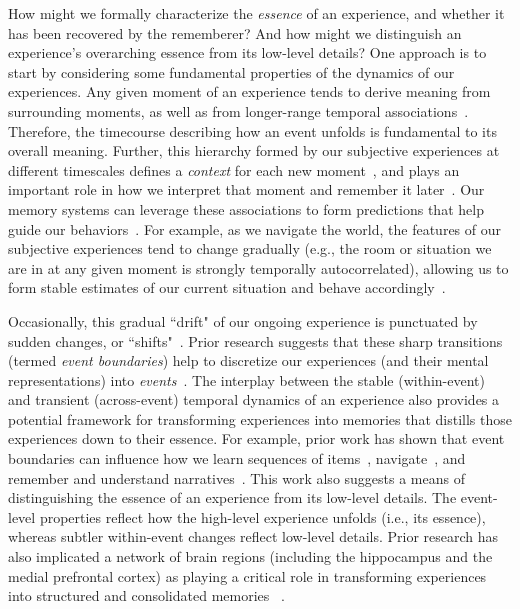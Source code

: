 \documentclass{article}
\begin{document}
How might we formally characterize the \textit{essence} of an experience, and whether it has been recovered by the rememberer?  And how might we distinguish an experience's overarching essence from its low-level details?  One approach is to start by considering some fundamental properties of the dynamics of our experiences.  Any given moment of an experience tends to derive meaning from surrounding moments, as well as from longer-range temporal associations~\citep{LernEtal11, Mann19, Mann20}.  Therefore, the timecourse describing how an event unfolds is fundamental to its overall meaning.  Further, this hierarchy formed by our subjective experiences at different timescales defines a \textit{context} for each new moment~\citep[e.g., ][]{HowaKaha02a, HowaEtal14}, and plays an important role in how we interpret that moment and remember it later~\citep[for review see][]{MannEtal15, Mann20}.  Our memory systems can leverage these associations to form predictions that help guide our behaviors~\citep{RangRitc12}.  For example, as we navigate the world, the features of our subjective experiences tend to change gradually (e.g., the room or situation we are in at any given moment is strongly temporally autocorrelated), allowing us to form stable estimates of our current situation and behave accordingly~\citep{ZackEtal07, ZwaaRadv98}.

Occasionally, this gradual ``drift" of our ongoing experience is punctuated by sudden changes, or ``shifts"~\citep[e.g., when we walk through a doorway; ][]{RadvZack17}.  Prior research suggests that these sharp transitions (termed \textit{event boundaries}) help to discretize our experiences (and their mental representations) into \textit{events}~\citep{RadvZack17, BrunEtal18, HeusEtal18b, ClewDava17, EzzyDava11, DuBrDava13}.  The interplay between the stable (within-event) and transient (across-event) temporal dynamics of an experience also provides a potential framework for transforming experiences into memories that distills those experiences down to their essence.  For example, prior work has shown that event boundaries can influence how we learn sequences of items~\citep{HeusEtal18b, DuBrDava13}, navigate~\citep{BrunEtal18}, and remember and understand narratives~\citep{ZwaaRadv98, EzzyDava11}.  This work also suggests a means of distinguishing the essence of an experience from its low-level details.  The event-level properties reflect how the high-level experience unfolds (i.e., its essence), whereas subtler within-event changes reflect low-level details.  Prior research has also implicated a network of brain regions (including the hippocampus and the medial prefrontal cortex) as playing a critical role in transforming experiences into structured and consolidated memories ~\citep{TompDava17}.
\end{document}
